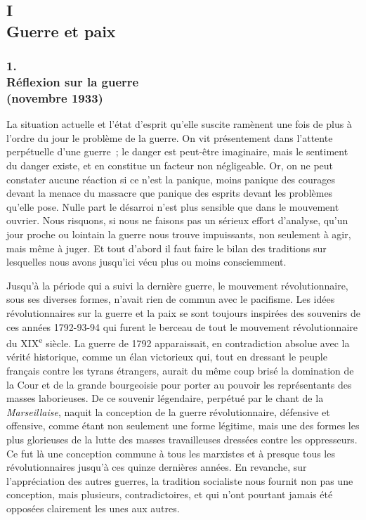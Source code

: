 \documentclass[french,twoside]{book} %
\begin{document}
\subsection[I. Guerre et paix]{I \\
Guerre et paix}
\subsubsection[1. Réflexion sur la guerre, (novembre 1933)]{1. \\
Réflexion sur la guerre \\
(novembre 1933)}
\noindent \par
La situation actuelle et l'état d'esprit qu'elle suscite ramènent une fois de plus à l'ordre du jour le problème de la guerre. On vit présentement dans l'attente perpétuelle d'une guerre ; le danger est peut-être imaginaire, mais le sentiment du danger existe, et en constitue un facteur non négligeable. Or, on ne peut constater aucune réaction si ce n'est la panique, moins panique des courages devant la menace du massacre que panique des esprits devant les problèmes qu'elle pose. Nulle part le désarroi n'est plus sensible que dans le mouvement ouvrier. Nous risquons, si nous ne faisons pas un sérieux effort d'analyse, qu'un jour proche ou lointain la guerre nous trouve impuissants, non seulement à agir, mais même à juger. Et tout d'abord il faut faire le bilan des traditions sur lesquelles nous avons jusqu'ici vécu plus ou moins con­sciemment.\par
Jusqu'à la période qui a suivi la dernière guerre, le mouvement révolution­naire, sous ses diverses formes, n'avait rien de commun avec le pacifisme. Les idées révolutionnaires sur la guerre et la paix se sont toujours inspirées des souvenirs de ces années 1792-93-94 qui furent le berceau de tout le mouvement révolutionnaire du XIX\textsuperscript{e} siècle. La guerre de 1792 apparaissait, en contradiction absolue avec la vérité historique, comme un élan victorieux qui, tout en dressant le peuple français contre les tyrans étrangers, aurait du même coup brisé la domination de la Cour et de la grande bourgeoisie pour porter au pouvoir les représentants des masses laborieuses. De ce souvenir légendaire, perpétué par le chant de la {\itshape Marseillaise}, naquit la conception de la guerre révolutionnaire, défensive et offensive, comme étant non seulement une forme légitime, mais une des formes les plus glorieuses de la lutte des masses tra­vailleuses dressées contre les oppresseurs. Ce fut là une conception commune à tous les marxistes et à presque tous les révolutionnaires jusqu'à ces quinze dernières années. En revanche, sur l'appréciation des autres guerres, la tradi­tion socialiste nous fournit non pas une conception, mais plusieurs, contra­dictoires, et qui n'ont pourtant jamais été opposées clairement les unes aux autres.\par
\end{document}
